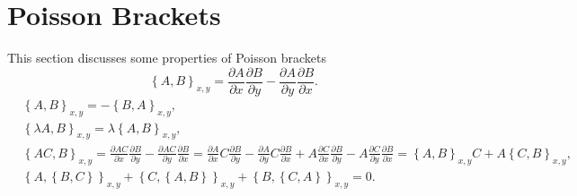 \documentclass[a4paper]{article}
\begin{document}
\section{Poisson Brackets}
This section discusses some properties of Poisson brackets
\begin{equation}
\left\{ A,B\right\}_{x,y}=\frac{\partial A}{\partial x}\frac{\partial B}{\partial y}-\frac{\partial A}{\partial y}\frac{\partial B}{\partial x}.
\end{equation}
\begin{equation}
\begin{split}
&\left\{ A,B\right\}_{x,y}=-\left\{ B,A\right\}_{x,y},\\
&\left\{ \lambda A,B\right\}_{x,y}=\lambda\left\{ A,B\right\}_{x,y},\\
&\left\{AC,B\right\}_{x,y}=\frac{\partial AC}{\partial x}\frac{\partial B}{\partial y}-\frac{\partial AC}{\partial y}\frac{\partial B}{\partial x}=\frac{\partial A}{\partial x}C\frac{\partial B}{\partial y}-\frac{\partial A}{\partial y}C\frac{\partial B}{\partial x}+A\frac{\partial C}{\partial x}\frac{\partial B}{\partial y}-A\frac{\partial C}{\partial y}\frac{\partial B}{\partial x}=\left\{A,B\right\}_{x,y}C+A\left\{C,B\right\}_{x,y},\\
&\left\{ A,\left\{B,C\right\}\right\}_{x,y}+\left\{ C,\left\{A,B\right\}\right\}_{x,y}+\left\{ B,\left\{C,A\right\}\right\}_{x,y}=0.
\end{split}
\end{equation}
\end{document}
